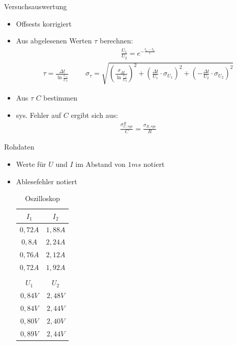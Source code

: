 \documentclass[11pt]{beamer}
\begin{document}
\begin{frame}{Versuchsauswertung}
\begin{itemize}
\subsection{Versuchsauswertung}
\item Offsests korrigiert
\item Aus abgelesenen Werten $\tau$ berechnen:
\begin{align*}
\frac{U_1}{U_2}=e^{-\frac{t_1-t_2}{\tau}}
\end{align*}
\begin{align*}
\tau=\frac{\Delta t}{\ln{\frac{U_1}{U_2}}} \hspace{1cm}
\sigma_{\tau}=\sqrt{(\frac{\sigma_{\Delta t}}{\ln{\frac{U_1}{U_2}}})^2+(\frac{\Delta t}{U_1} \cdot \sigma_{U_1})^2+(-\frac{\Delta t}{U_2} \cdot \sigma_{U_2})^2}
\end{align*}
\item Aus $\tau$ $C$ bestimmen
\item sys. Fehler auf $C$ ergibt sich aus:
\begin{align*}
\frac{\sigma_{C,sys}^R}{C}=\frac{\sigma_{R,sys}}{R}
\end{align*}
\end{itemize}
\end{frame}
\begin{frame}{Rohdaten}
\begin{itemize}
\subsubsection{Rohdaten}
\item Werte für $U$ und $I$ im Abstand von $1ms$ notiert
\item Ablesefehler notiert
\begin{table}[H]\centering
\caption{Oszilloskop}
\begin{tabular}{c|c}
$I_1$& $I_2$\\ \hline
$0,72A$& $1,88A$\\ 
$0,8A$& $2,24A$ \\
$0,76A$& $2,12A$ \\
$0,72A$& $1,92A$ \\
\\
$U_1$& $U_2$ \\ \hline
$0,84V$& $2,48V$ \\
$0,84V$& $2,44V$ \\
$0,80V$& $2,40V$ \\
$0,89V$& $2,44V$ \\
\end{tabular} 
\end{table}
\end{itemize}
\end{frame}
\end{document}
